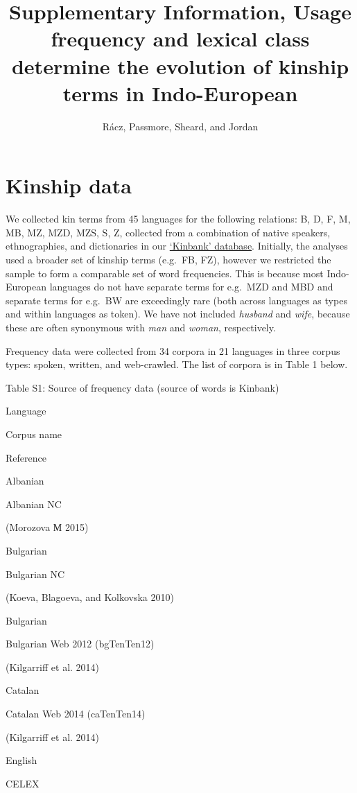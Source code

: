 \documentclass[]{article}
\title{Supplementary Information, Usage frequency and lexical class determine
the evolution of kinship terms in Indo-European}
\author{Rácz, Passmore, Sheard, and Jordan}
\date{}
\begin{document}
\maketitle

{
\setcounter{tocdepth}{2}
\tableofcontents
}
\hypertarget{kinship-data}{%
\section{Kinship data}\label{kinship-data}}

We collected kin terms from 45 languages for the following relations: B,
D, F, M, MB, MZ, MZD, MZS, S, Z, collected from a combination of native
speakers, ethnographies, and dictionaries in our
\href{https://excd.org/research-activities/kinbank/}{`Kinbank'
database}. Initially, the analyses used a broader set of kinship terms
(e.g.~FB, FZ), however we restricted the sample to form a comparable set
of word frequencies. This is because most Indo-European languages do not
have separate terms for e.g.~MZD and MBD and separate terms for e.g.~BW
are exceedingly rare (both across languages as types and within
languages as token). We have not included \emph{husband} and
\emph{wife}, because these are often synonymous with \emph{man} and
\emph{woman}, respectively.

Frequency data were collected from 34 corpora in 21 languages in three
corpus types: spoken, written, and web-crawled. The list of corpora is
in Table 1 below.

Table S1: Source of frequency data (source of words is Kinbank)

Language

Corpus name

Reference

Albanian

Albanian NC

(Morozova М 2015)

Bulgarian

Bulgarian NC

(Koeva, Blagoeva, and Kolkovska 2010)

Bulgarian

Bulgarian Web 2012 (bgTenTen12)

(Kilgarriff et al. 2014)

Catalan

Catalan Web 2014 (caTenTen14)

(Kilgarriff et al. 2014)

English

CELEX
\end{document}
